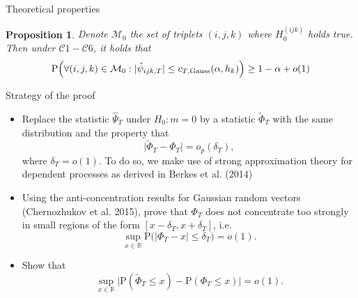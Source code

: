 \documentclass[10pt]{beamer}
\newcommand{\Prob}{\mathrm{P}}
\newtheorem{prop}{Proposition}
\begin{document}
\begin{frame}{Theoretical properties}
\begin{prop}\label{prop-equality-1}
Denote $\mathcal{M}_0$ the set of triplets $(i, j, k)$ where $H_0^{(ijk)}$ holds true. Then under $\mathcal{C}1 - \mathcal{C}6$, it holds that 
\begin{align*}
 \Prob\Big( \forall (i,j,k) \in \mathcal{M}_0: |\hat{\psi}_{ijk,T}| \le c_{T,\textnormal{Gauss}}(\alpha,h_k) \Big) \ge 1 - \alpha + o(1)
\end{align*}
\end{prop}
\end{frame}


\begin{frame}{Strategy of the proof}
\begin{itemize}
\item Replace the statistic $\widehat{\Psi}_T$ under $H_0: m = 0$ by a statistic $\widetilde{\Phi}_T$ with the same distribution and the property that 
\begin{equation*}\label{eq-theo-stat-strategy-step1}
\big| \widetilde{\Phi}_T - \Phi_T \big| = o_p(\delta_T),
\end{equation*}
where $\delta_T = o(1)$. To do so, we make use of strong approximation theory for dependent processes as derived in Berkes et al. (2014)\pause
\vspace{2mm}
\item Using the anti-concentration results for Gaussian random vectors (Chernozhukov et al. 2015), prove that $\Phi_T$ does not concentrate too strongly in small regions of the form $[x-\delta_T,x+\delta_T]$, i.e.
\begin{equation*}\label{eq-theo-stat-strategy-step2}
\sup_{x \in \mathbb{R}} \Prob \big( |\Phi_T - x| \le \delta_T \big) = o(1).
\end{equation*}\pause
\vspace{-2mm}
\item Show that 
\begin{equation*}\label{eq-theo-stat-strategy-claim}
\sup_{x \in \mathbb{R}} \big| \Prob(\widetilde{\Phi}_T \le x) - \Prob(\Phi_T \le x) \big| = o(1). 
\end{equation*}
\end{itemize}
\end{frame}
\end{document}
